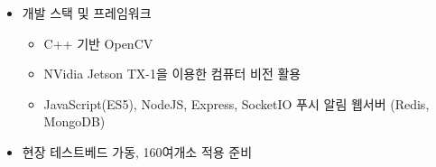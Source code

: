 \begin{itemize}
	\item 개발 스택 및 프레임워크
	      \begin{itemize}
		      \item C++ 기반 OpenCV
		      \item NVidia Jetson TX-1을 이용한 컴퓨터 비전 활용
		      \item JavaScript(ES5), NodeJS, Express, SocketIO 푸시 알림 웹서버 (Redis, MongoDB)
	      \end{itemize}
	\item 현장 테스트베드 가동, 160여개소 적용 준비
\end{itemize}

\divider


